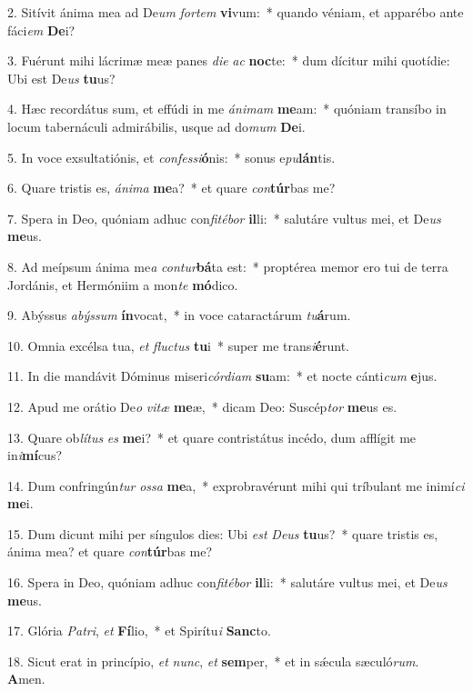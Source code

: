 2. Sitívit ánima mea ad De\textit{um} \textit{for}\textit{tem} \textbf{vi}vum:~*  quando véniam, et apparébo ante fáci\textit{em} \textbf{De}i?\

3. Fuérunt mihi lácrimæ meæ panes \textit{di}\textit{e} \textit{ac} \textbf{noc}te:~*  dum dícitur mihi quotídie: Ubi est De\textit{us} \textbf{tu}us?\

4. Hæc recordátus sum, et effúdi in me \textit{á}\textit{ni}\textit{mam} \textbf{me}am:~*  quóniam transíbo in locum tabernáculi admirábilis, usque ad do\textit{mum} \textbf{De}i.\

5. In voce exsultatiónis, et \textit{con}\textit{fes}\textit{si}\textbf{ó}nis:~*  sonus e\textit{pu}\textbf{lán}tis.\

6. Quare tristis es, \textit{á}\textit{ni}\textit{ma} \textbf{me}a?~*  et quare \textit{con}\textbf{túr}bas me?\

7. Spera in Deo, quóniam adhuc con\textit{fi}\textit{té}\textit{bor} \textbf{il}li:~*  salutáre vultus mei, et De\textit{us} \textbf{me}us.\

8. Ad meípsum ánima me\textit{a} \textit{con}\textit{tur}\textbf{bá}ta est:~*  proptérea memor ero tui de terra Jordánis, et Hermóniim a mon\textit{te} \textbf{mó}dico.\

9. Abýssus \textit{a}\textit{býs}\textit{sum} \textbf{ín}vocat,~*  in voce cataractárum \textit{tu}\textbf{á}rum.\

10. Omnia excélsa tua, \textit{et} \textit{fluc}\textit{tus} \textbf{tu}i~*  super me trans\textit{i}\textbf{é}runt.\

11. In die mandávit Dóminus miseri\textit{cór}\textit{di}\textit{am} \textbf{su}am:~*  et nocte cánti\textit{cum} \textbf{e}jus.\

12. Apud me orátio De\textit{o} \textit{vi}\textit{tæ} \textbf{me}æ,~*  dicam Deo: Suscép\textit{tor} \textbf{me}us es.\

13. Quare ob\textit{lí}\textit{tus} \textit{es} \textbf{me}i?~*  et quare contristátus incédo, dum afflígit me in\textit{i}\textbf{mí}cus?\

14. Dum confringún\textit{tur} \textit{os}\textit{sa} \textbf{me}a,~*  exprobravérunt mihi qui tríbulant me inimí\textit{ci} \textbf{me}i.\

15. Dum dicunt mihi per síngulos dies: Ubi \textit{est} \textit{De}\textit{us} \textbf{tu}us?~*  quare tristis es, ánima mea? et quare \textit{con}\textbf{túr}bas me?\

16. Spera in Deo, quóniam adhuc con\textit{fi}\textit{té}\textit{bor} \textbf{il}li:~*  salutáre vultus mei, et De\textit{us} \textbf{me}us.\

17. Glória \textit{Pa}\textit{tri}, \textit{et} \textbf{Fí}lio,~*  et Spirítu\textit{i} \textbf{Sanc}to.\

18. Sicut erat in princípio, \textit{et} \textit{nunc}, \textit{et} \textbf{sem}per,~*  et in sǽcula sæculó\textit{rum}. \textbf{A}men.\

